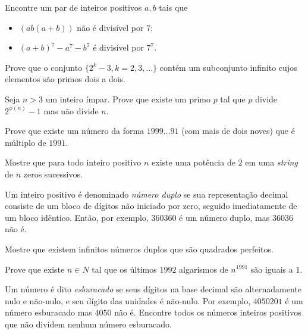 \begin{questao}
  Encontre um par de inteiros positivos $a,b$ tais que
  \begin{itemize}
    \item $(ab(a+b))$ não é divisível por $7$;

    \item $(a+b)^7-a^7-b^7$ é divisível por $7^7$.
  \end{itemize}
\end{questao}

\begin{questao}
  Prove que o conjunto $\{2^k-3, k=2,3,\ldots\}$ contém um subconjunto infinito
  cujos elementos são primos dois a dois.
\end{questao}

\begin{questao}
  Seja $n>3$ um inteiro ímpar. Prove que existe um primo $p$ tal que $p$ divide
  $2^{\phi(n)}-1$ mas não divide $n$.
\end{questao}

\begin{questao}
  Prove que existe um número da forma $1999 \ldots 91$ (com mais de dois noves)
  que é múltiplo de $1991$.
\end{questao}

\begin{questao}
  Mostre que para todo inteiro positivo $n$ existe uma potência de $2$ em uma
  {\it string} de $n$ zeros sucessivos.
\end{questao}

\begin{questao}
  Um inteiro positivo é denominado {\it número duplo} se sua representação
  decimal consiste de um bloco de dígitos não iniciado por zero, seguido
  imediatamente de um bloco idêntico. Então, por exemplo, $360360$ é um número
  duplo, mas $36036$ não é.

  Mostre que existem infinitos números duplos que são quadrados perfeitos.
\end{questao}

\begin{questao}
  Prove que existe $n \in N$ tal que os últimos $1992$ algarismos
  de $n^{1991}$ são iguais a $1$.
\end{questao}

\begin{questao}
  Um número é dito {\it esburacado} se seus dígitos na base
  decimal são alternadamente nulo e não-nulo, e seu dígito das
  unidades é não-nulo. Por exemplo, $4050201$ é um número esburacado
  mas $4050$ não é. Encontre todos os números inteiros positivos que
  não dividem nenhum número esburacado.
\end{questao}

